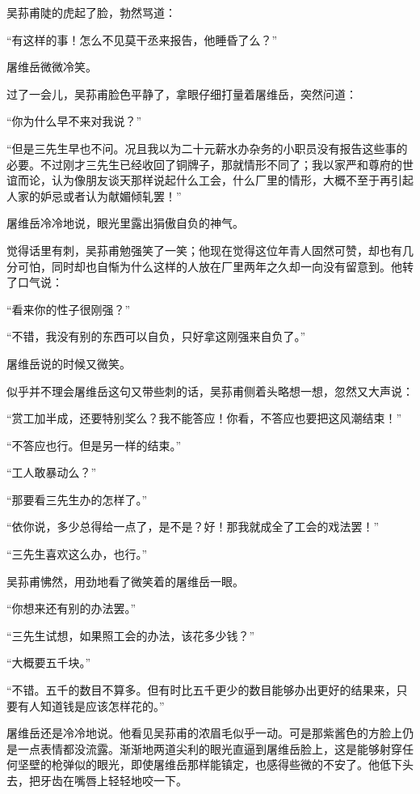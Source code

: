 \par 吴荪甫陡的虎起了脸，勃然骂道：
\par “有这样的事！怎么不见莫干丞来报告，他睡昏了么？”
\par 屠维岳微微冷笑。
\par 过了一会儿，吴荪甫脸色平静了，拿眼仔细打量着屠维岳，突然问道：
\par “你为什么早不来对我说？”
\par “但是三先生早也不问。况且我以为二十元薪水办杂务的小职员没有报告这些事的必要。不过刚才三先生已经收回了铜牌子，那就情形不同了；我以家严和尊府的世谊而论，认为像朋友谈天那样说起什么工会，什么厂里的情形，大概不至于再引起人家的妒忌或者认为献媚倾轧罢！”
\par 屠维岳冷冷地说，眼光里露出狷傲自负的神气。
\par 觉得话里有刺，吴荪甫勉强笑了一笑；他现在觉得这位年青人固然可赞，却也有几分可怕，同时却也自惭为什么这样的人放在厂里两年之久却一向没有留意到。他转了口气说：
\par “看来你的性子很刚强？”
\par “不错，我没有别的东西可以自负，只好拿这刚强来自负了。”
\par 屠维岳说的时候又微笑。
\par 似乎并不理会屠维岳这句又带些刺的话，吴荪甫侧着头略想一想，忽然又大声说：
\par “赏工加半成，还要特别奖么？我不能答应！你看，不答应也要把这风潮结束！”
\par “不答应也行。但是另一样的结束。”
\par “工人敢暴动么？”
\par “那要看三先生办的怎样了。”
\par “依你说，多少总得给一点了，是不是？好！那我就成全了工会的戏法罢！”
\par “三先生喜欢这么办，也行。”
\par 吴荪甫怫然，用劲地看了微笑着的屠维岳一眼。
\par “你想来还有别的办法罢。”
\par “三先生试想，如果照工会的办法，该花多少钱？”
\par “大概要五千块。”
\par “不错。五千的数目不算多。但有时比五千更少的数目能够办出更好的结果来，只要有人知道钱是应该怎样花的。”
\par 屠维岳还是冷冷地说。他看见吴荪甫的浓眉毛似乎一动。可是那紫酱色的方脸上仍是一点表情都没流露。渐渐地两道尖利的眼光直逼到屠维岳脸上，这是能够射穿任何坚壁的枪弹似的眼光，即使屠维岳那样能镇定，也感得些微的不安了。他低下头去，把牙齿在嘴唇上轻轻地咬一下。
